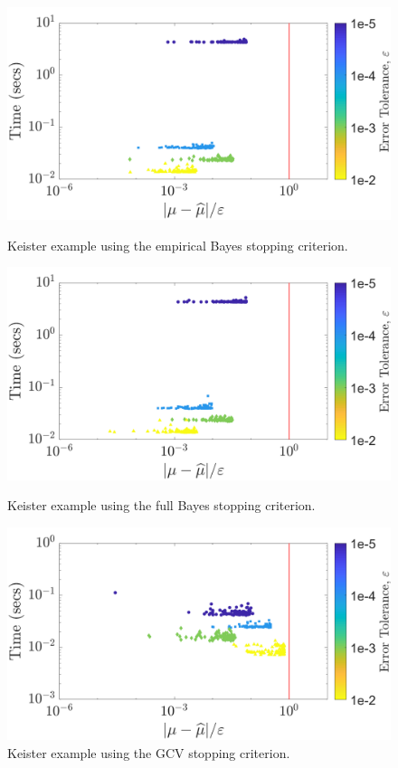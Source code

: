 \documentclass[twocolumn]{svjour3}          %
\begin{document}
\begin{figure}
	\centering
	\includegraphics[width=0.95\linewidth]{"Keister_guaranteed_time_MLE_C1sin_d4_r2_2018-Sep-6"}
	\caption[Keister guaranteed:MLE]{Keister example using the empirical Bayes stopping criterion.}
	\label{fig:keister-guaranteed-MLE}
	\centering
	\includegraphics[width=0.95\linewidth]{"Keister_guaranteed_time_full_C1sin_d4_r2_2018-Sep-6"}
	\caption[Keister guaranteed:FB]{Keister example using the full Bayes stopping criterion.}
	\label{fig:keister-guaranteed-FB}
	\centering
	\includegraphics[width=0.95\linewidth]{"Keister_guaranteed_time_GCV_C1sin_d4_r2_2018-Sep-6"}
	\caption[Keister guaranteed:GCV]{Keister example using the GCV stopping criterion.}
	\label{fig:keister-guaranteed-GCV}
\end{figure}
\end{document}
